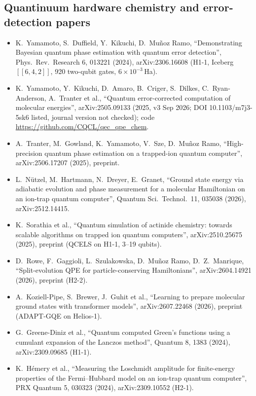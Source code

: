 \documentclass[11pt,a4paper]{article}
\begin{document}
\subsection*{Quantinuum hardware chemistry and error-detection papers}
\begin{itemize}\small\sloppy
\item K.~Yamamoto, S.~Duffield, Y.~Kikuchi, D.~Mu\~noz Ramo, ``Demonstrating Bayesian quantum phase estimation with quantum error detection'', Phys.\ Rev.\ Research 6, 013221 (2024), arXiv:2306.16608 (H1-1, Iceberg $[[6,4,2]]$, 920 two-qubit gates, $6\times10^{-3}$\,Ha).
\item K.~Yamamoto, Y.~Kikuchi, D.~Amaro, B.~Criger, S.~Dilkes, C.~Ryan-Anderson, A.~Tranter et al., ``Quantum error-corrected computation of molecular energies'', arXiv:2505.09133 (2025, v3 Sep 2026; DOI 10.1103/m7j3-5sk6 listed, journal version not checked); code \url{https://github.com/CQCL/qec_qpe_chem}.
\item A.~Tranter, M.~Gowland, K.~Yamamoto, V.~Sze, D.~Mu\~noz Ramo, ``High-precision quantum phase estimation on a trapped-ion quantum computer'', arXiv:2506.17207 (2025), preprint.
\item L.~N\"utzel, M.~Hartmann, N.~Dreyer, E.~Granet, ``Ground state energy via adiabatic evolution and phase measurement for a molecular Hamiltonian on an ion-trap quantum computer'', Quantum Sci.\ Technol.\ 11, 035038 (2026), arXiv:2512.14415.
\item K.~Sorathia et al., ``Quantum simulation of actinide chemistry: towards scalable algorithms on trapped ion quantum computers'', arXiv:2510.25675 (2025), preprint (QCELS on H1-1, 3--19 qubits).
\item D.~Rowe, F.~Gaggioli, L.~Szulakowska, D.~Mu\~noz Ramo, D.~Z.~Manrique, ``Split-evolution QPE for particle-conserving Hamiltonians'', arXiv:2604.14921 (2026), preprint (H2-2).
\item A.~Koziell-Pipe, S.~Brewer, J.~Guhit et al., ``Learning to prepare molecular ground states with transformer models'', arXiv:2607.22468 (2026), preprint (ADAPT-GQE on Helios-1).
\item G.~Greene-Diniz et al., ``Quantum computed Green's functions using a cumulant expansion of the Lanczos method'', Quantum 8, 1383 (2024), arXiv:2309.09685 (H1-1).
\item K.~H\'emery et al., ``Measuring the Loschmidt amplitude for finite-energy properties of the Fermi--Hubbard model on an ion-trap quantum computer'', PRX Quantum 5, 030323 (2024), arXiv:2309.10552 (H2-1).

\end{itemize}
\end{document}
